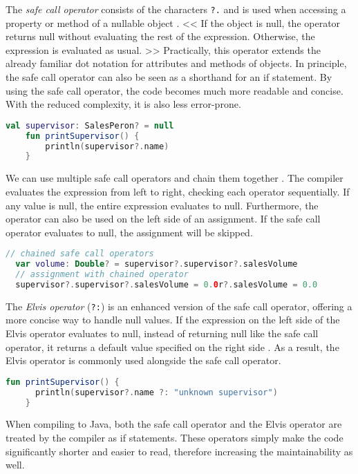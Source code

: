 \documentclass[a4paper, 11pt]{article}
\begin{document}
  The \textit{safe call operator} consists of the characters \texttt{?.} and is used when accessing a property or method of a nullable object \cite{nullsafety-safe-call}. << If the object is null, the operator returns null without evaluating the rest of the expression. Otherwise, the expression is evaluated as usual. >> Practically, this operator extends the already familiar dot notation for attributes and methods of objects. In principle, the safe call operator can also be seen as a shorthand for an if statement. By using the safe call operator, the code becomes much more readable and concise. With the reduced complexity, it is also less error-prone.
  \begin{lstlisting}[language=Kotlin]
    val supervisor: SalesPeron? = null
    fun printSupervisor() {
        println(supervisor?.name)
    }
  \end{lstlisting}
  We can use multiple safe call operators and chain them together \cite{nullsafety-safe-call}. The compiler evaluates the expression from left to right, checking each operator sequentially. If any value is null, the entire expression evaluates to null.
  Furthermore, the operator can also be used on the left side of an assignment. If the safe call operator evaluates to null, the assignment will be skipped.
  \begin{lstlisting}[language=Kotlin]
  // chained safe call operators
  var volume: Double? = supervisor?.supervisor?.salesVolume
  // assignment with chained operator
  supervisor?.supervisor?.salesVolume = 0.0r?.salesVolume = 0.0
  \end{lstlisting}

  The \textit{Elvis operator} (\texttt{?:}) is an enhanced version of the safe call operator, offering a more concise way to handle null values. If the expression on the left side of the Elvis operator evaluates to null, instead of returning null like the safe call operator, it returns a default value specified on the right side \cite{nullsafety-elvis}. As a result, the Elvis operator is commonly used alongside the safe call operator.
  \begin{lstlisting}[language=Kotlin]
    fun printSupervisor() {
      println(supervisor?.name ?: "unknown supervisor")
    }
  \end{lstlisting}
  When compiling to Java, both the safe call operator and the Elvis operator are treated by the compiler as if statements. These operators simply make the code significantly shorter and easier to read, therefore increasing the maintainability as well.
 
\end{document}
